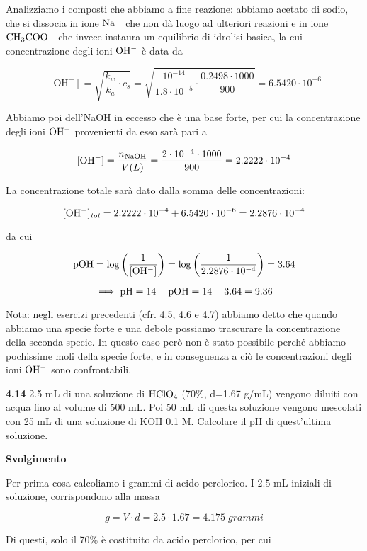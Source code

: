 Analizziamo i composti che abbiamo a fine reazione: abbiamo acetato di sodio, che si dissocia in ione $\rm Na^+$ che non dà luogo ad ulteriori reazioni e in ione $\rm CH_3COO^-$ che invece instaura un equilibrio di idrolisi basica, la cui concentrazione degli ioni $\rm OH^-$ è data da

$$[\text{OH}^-]
=\sqrt{\frac{k_w}{k_a}\cdot c_s}
=\sqrt{\frac{10^{-14}}{1.8 \cdot 10^{-5}} \cdot \frac{0.2498 \cdot 1000}{900}}
=6.5420 \cdot 10^{-6}$$

Abbiamo poi dell'NaOH in eccesso che è una base forte, per cui la concentrazione degli ioni $\rm OH^-$ provenienti da esso sarà pari a

$$[\text{OH}^-]=\frac{n_{\rm NaOH}}{V(L)}
=\frac{2 \cdot 10^{-4} \cdot 1000}{900}=2.2222 \cdot 10^{-4}$$

La concentrazione totale sarà dato dalla somma delle concentrazioni:

$$\rm [OH^-]_{\textit{tot}}=2.2222 \cdot 10^{-4} + 6.5420 \cdot 10^{-6}
=2.2876 \cdot 10^{-4}$$

da cui

$$\rm pOH=\log{\left(\frac{1}{[OH^-]}\right)}
=\log{\left(\frac{1}{2.2876 \cdot 10^{-4}}\right)}=3.64$$

$$\implies \rm pH=14-pOH=14-3.64=9.36$$

Nota: negli esercizi precedenti (cfr. 4.5, 4.6 e 4.7) abbiamo detto che quando abbiamo una specie forte e una debole possiamo trascurare la concentrazione della seconda specie. In questo caso però non è stato possibile perché abbiamo pochissime moli della specie forte, e in conseguenza a ciò le concentrazioni degli ioni $\rm OH^-$ sono confrontabili.

\vspace{0.2cm}\textbf{4.14} 2.5 mL di una soluzione di $\rm HClO_4$ (70\%, d=1.67 g/mL) vengono diluiti con acqua fino al
volume di 500 mL. Poi 50 mL di questa soluzione vengono mescolati con 25 mL di una soluzione di KOH 0.1 M. Calcolare il pH di quest'ultima soluzione.

\vspace{0.2cm}\large\textbf{Svolgimento}\normalsize

\vspace{0.2cm}Per prima cosa calcoliamo i grammi di acido perclorico. I $2.5$ mL iniziali di soluzione, corrispondono alla massa

$$g=V \cdot d=2.5 \cdot 1.67=4.175\;grammi$$

Di questi, solo il 70\% è costituito da acido perclorico, per cui

